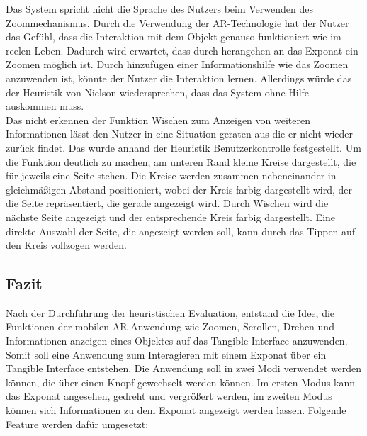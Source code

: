 \documentclass[runningheads,a4paper]{llncs}
\begin{document}
Das System spricht nicht die Sprache des Nutzers beim Verwenden des Zoommechanismus. Durch die Verwendung der AR-Technologie hat der Nutzer das Gefühl, dass die Interaktion mit dem Objekt genauso funktioniert wie im reelen Leben. Dadurch wird erwartet, dass durch herangehen an das Exponat ein Zoomen möglich ist. Durch hinzufügen einer Informationshilfe wie das Zoomen anzuwenden ist, könnte der Nutzer die Interaktion lernen. Allerdings würde das der Heuristik von Nielson wiedersprechen, dass das System ohne Hilfe auskommen muss.\\

Das nicht erkennen der Funktion Wischen zum Anzeigen von weiteren Informationen lässt den Nutzer in eine Situation geraten aus die er nicht wieder zurück findet. Das wurde anhand der Heuristik Benutzerkontrolle festgestellt. Um die Funktion deutlich zu machen, am unteren Rand kleine Kreise dargestellt, die für jeweils eine Seite stehen. Die Kreise werden zusammen nebeneinander in gleichmäßigen Abstand positioniert, wobei der Kreis farbig dargestellt wird, der die Seite repräsentiert, die gerade angezeigt wird. Durch Wischen wird die nächste Seite angezeigt und der entsprechende Kreis farbig dargestellt. Eine direkte Auswahl der Seite, die angezeigt werden soll, kann durch das Tippen auf den Kreis vollzogen werden.\\


\subsection{Fazit}
Nach der Durchführung der heuristischen Evaluation, entstand die Idee, die Funktionen  der mobilen AR Anwendung wie Zoomen, Scrollen, Drehen und Informationen anzeigen eines Objektes auf das Tangible Interface anzuwenden. Somit soll eine Anwendung zum Interagieren mit einem Exponat über ein Tangible Interface entstehen. Die Anwendung soll in zwei Modi verwendet werden können, die über einen Knopf gewechselt werden können. Im ersten Modus kann das Exponat angesehen, gedreht und vergrößert werden, im zweiten Modus können sich Informationen zu dem Exponat angezeigt werden lassen. Folgende Feature werden dafür umgesetzt:
\end{document}
